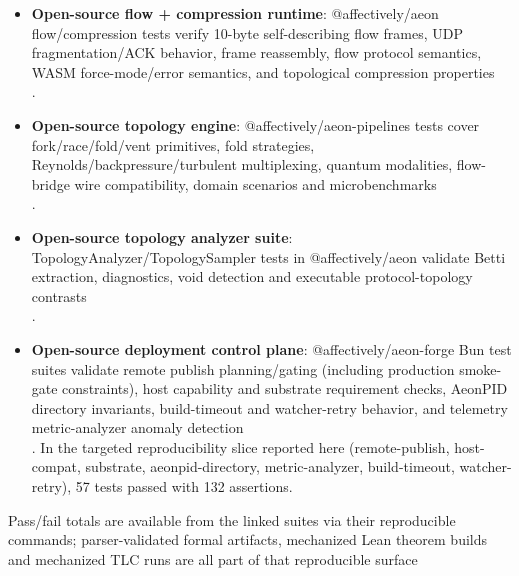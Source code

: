 \documentclass[
]{article}
\begin{document}
\begin{itemize}
  Lean 4 theorem package with constructive identities, infinite-support,
  countably supported stochastic, measure-theoretic, stable M/M/1, and
  Cesaro queueing lifts, plus explicit-assumption theorem schemas
  (including the stronger correspondence-boundary property-negation and
  general nonadditive-fold impossibility theorem plus the global
  convergence schema) verify the strongest operational claims section by
  section\\
  .\\
\item
  \textbf{Open-source flow + compression runtime}: @affectively/aeon
  flow/compression tests verify 10-byte self-describing flow frames, UDP
  fragmentation/ACK behavior, frame reassembly, flow protocol semantics,
  WASM force-mode/error semantics, and topological compression
  properties\\
  .\\
\item
  \textbf{Open-source topology engine}: @affectively/aeon-pipelines
  tests cover fork/race/fold/vent primitives, fold strategies,
  Reynolds/backpressure/turbulent multiplexing, quantum modalities,
  flow-bridge wire compatibility, domain scenarios and microbenchmarks\\
  .\\
\item
  \textbf{Open-source topology analyzer suite}:
  TopologyAnalyzer/TopologySampler tests in @affectively/aeon validate
  Betti extraction, diagnostics, void detection and executable
  protocol-topology contrasts\\
  .\\
\item
  \textbf{Open-source deployment control plane}: @affectively/aeon-forge
  Bun test suites validate remote publish planning/gating (including
  production smoke-gate constraints), host capability and substrate
  requirement checks, AeonPID directory invariants, build-timeout and
  watcher-retry behavior, and telemetry metric-analyzer anomaly
  detection\\
  . In the targeted reproducibility slice reported here (remote-publish,
  host-compat, substrate, aeonpid-directory, metric-analyzer,
  build-timeout, watcher-retry), 57 tests passed with 132 assertions.
\end{itemize}

Pass/fail totals are available from the linked suites via their
reproducible commands; parser-validated formal artifacts, mechanized
Lean theorem builds and mechanized TLC runs are all part of that
reproducible surface
\end{document}
